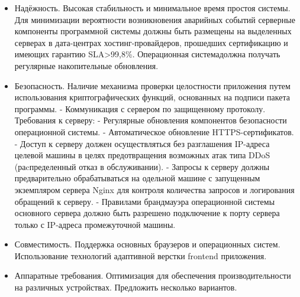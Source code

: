 \begin{itemize}
    \item Надёжность. Высокая стабильность и минимальное время простоя системы. Для минимизации вероятности возникновения аварийных событий серверные компоненты программной системы должны быть размещены на выделенных серверах в дата-центрах хостинг-провайдеров, прошедших сертификацию и имеющих гарантию SLA>99,8\%. Операционная системадолжна получать регулярные накопительные обновления.
    \item Безопасность. Наличие механизма проверки целостности приложения путем использования криптографических функций, основанных на подписи пакета программы. - Коммуникация с сервером по защищенному протоколу. Требования к серверу: - Регулярные обновления компонентов безопасности операционной системы. - Автоматическое обновление HTTPS-сертификатов. - Доступ к серверу должен осуществляться без разглашения IP-адреса целевой машины в целях предотвращения возможных атак типа DDoS (раcпределенный отказ в обслуживании). - Запросы к серверу должны предварительно обрабатываться на одельной машине с запущенным экземпляром сервера Nginx для контроля количества запросов и логирования обращений к серверу. - Правилами брандмауэра операционной системы основного сервера должно быть разрешено подключение к порту сервера только с IP-адреса промежуточной машины.
    \item Совместимость. Поддержка основных браузеров и операционных систем. Использование технологий адаптивной верстки frontend приложения.
    \item Аппаратные требования. Оптимизация для обеспечения производительности на различных устройствах. Предложить несколько вариантов.
\end{itemize}
